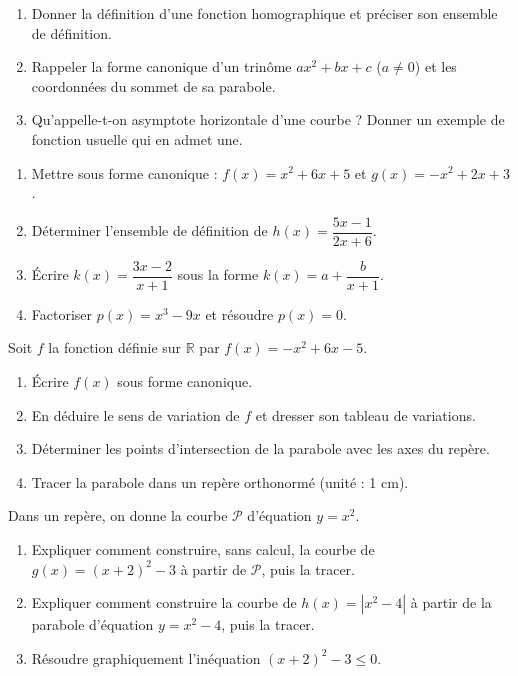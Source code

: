 \documentclass[11pt]{article}
\newcounter{popsec}
\newcounter{popsub}
\newcommand{\courssub}[1]{%
  \stepcounter{popsub}%
  \par\vspace{9pt}\noindent{\popxbold\fontsize{11.5}{13}\selectfont\color{popink}{\color{poporange}\thepopsec.\thepopsub}\hspace{6pt}#1}\par\nopagebreak\vspace{4pt}
}
\begin{document}
\begin{exercice}[Définitions]
\begin{enumerate}
\item Donner la définition d'une fonction homographique et préciser son ensemble de définition.
\item Rappeler la forme canonique d'un trinôme $ax^2+bx+c$ ($a\neq 0$) et les coordonnées du sommet de sa parabole.
\item Qu'appelle-t-on asymptote horizontale d'une courbe ? Donner un exemple de fonction usuelle qui en admet une.
\end{enumerate}
\end{exercice}

\begin{exercice}
\begin{enumerate}
\item Mettre sous forme canonique : $f(x)=x^2+6x+5$ et $g(x)=-x^2+2x+3$.
\item Déterminer l'ensemble de définition de $h(x)=\dfrac{5x-1}{2x+6}$.
\item Écrire $k(x)=\dfrac{3x-2}{x+1}$ sous la forme $k(x)=a+\dfrac{b}{x+1}$.
\item Factoriser $p(x)=x^3-9x$ et résoudre $p(x)=0$.
\end{enumerate}
\end{exercice}

\courssub{Je m'entraîne}

\begin{exercice}
Soit $f$ la fonction définie sur $\mathbb{R}$ par $f(x)=-x^2+6x-5$.
\begin{enumerate}
\item Écrire $f(x)$ sous forme canonique.
\item En déduire le sens de variation de $f$ et dresser son tableau de variations.
\item Déterminer les points d'intersection de la parabole avec les axes du repère.
\item Tracer la parabole dans un repère orthonormé (unité : 1 cm).
\end{enumerate}
\end{exercice}

\begin{exercice}
Dans un repère, on donne la courbe $\mathcal{P}$ d'équation $y=x^2$.
\begin{enumerate}
\item Expliquer comment construire, sans calcul, la courbe de $g(x)=(x+2)^2-3$ à partir de $\mathcal{P}$, puis la tracer.
\item Expliquer comment construire la courbe de $h(x)=|x^2-4|$ à partir de la parabole d'équation $y=x^2-4$, puis la tracer.
\item Résoudre graphiquement l'inéquation $(x+2)^2-3\leq 0$.
\end{enumerate}
\end{exercice}
\end{document}
